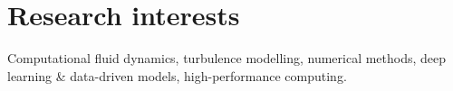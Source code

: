 \documentclass[line]{res}
\newenvironment{p}
  {\begin{adjustwidth}{-10pt}{0pt}}
  {\end{adjustwidth}}
\begin{document}


\begin{resume}
\section{}
\vspace{-15pt} 
\hfill

\noindent

\section{Research interests}
\begin{p}
Computational fluid dynamics, turbulence modelling, numerical methods, deep learning \& data-driven models, high-performance computing. 
\end{p}
 

\end{resume}
\end{document}
